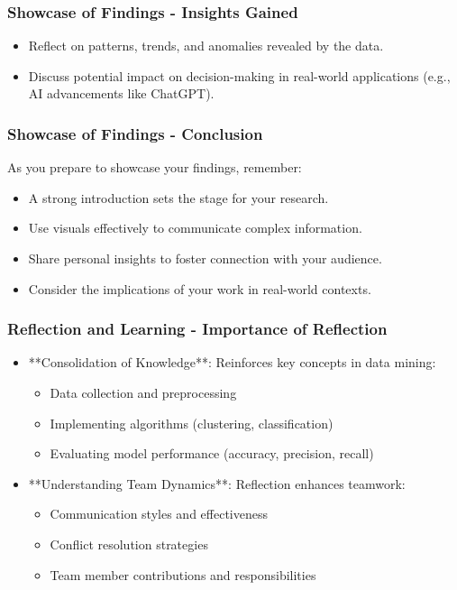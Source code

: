 \documentclass[aspectratio=169]{beamer}
\begin{document}
\begin{frame}[fragile]
    \frametitle{Showcase of Findings - Insights Gained}
    \begin{itemize}
        \item Reflect on patterns, trends, and anomalies revealed by the data.
        \item Discuss potential impact on decision-making in real-world applications (e.g., AI advancements like ChatGPT).
    \end{itemize}
\end{frame}

\begin{frame}[fragile]
    \frametitle{Showcase of Findings - Conclusion}
    As you prepare to showcase your findings, remember:
    \begin{itemize}
        \item A strong introduction sets the stage for your research.
        \item Use visuals effectively to communicate complex information.
        \item Share personal insights to foster connection with your audience.
        \item Consider the implications of your work in real-world contexts.
    \end{itemize}
\end{frame}

\begin{frame}[fragile]
    \frametitle{Reflection and Learning - Importance of Reflection}
    \begin{itemize}
        \item **Consolidation of Knowledge**: Reinforces key concepts in data mining:
        \begin{itemize}
            \item Data collection and preprocessing
            \item Implementing algorithms (clustering, classification)
            \item Evaluating model performance (accuracy, precision, recall)
        \end{itemize}
        
        \item **Understanding Team Dynamics**: Reflection enhances teamwork:
        \begin{itemize}
            \item Communication styles and effectiveness
            \item Conflict resolution strategies
            \item Team member contributions and responsibilities
        \end{itemize}
    \end{itemize}
\end{frame}
\end{document}
